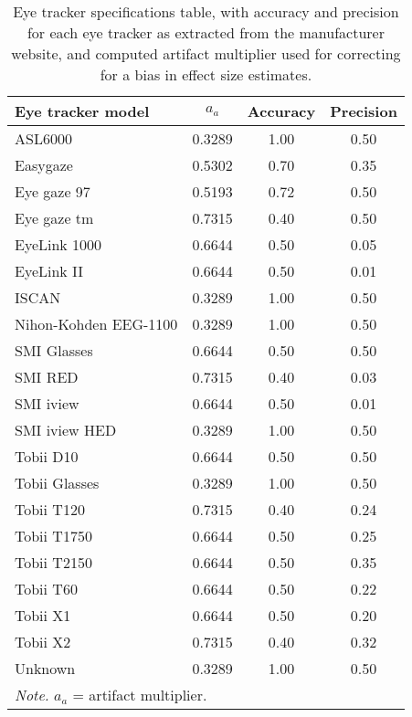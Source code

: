 \begin{table}[ht]
\centering
\caption{Eye tracker specifications table, with accuracy and precision for each eye tracker as extracted from the manufacturer website, and computed artifact multiplier used for correcting for a bias in effect size estimates.} 
\label{tab:eyetracker_specifications}
\begin{tabular}{lccc}
  \hline
Eye tracker model & $a_a$ & Accuracy & Precision \\ 
  \hline
ASL6000 & 0.3289 & 1.00 & 0.50 \\ 
  Easygaze & 0.5302 & 0.70 & 0.35 \\ 
  Eye gaze 97 & 0.5193 & 0.72 & 0.50 \\ 
  Eye gaze tm & 0.7315 & 0.40 & 0.50 \\ 
  EyeLink 1000 & 0.6644 & 0.50 & 0.05 \\ 
  EyeLink II & 0.6644 & 0.50 & 0.01 \\ 
  ISCAN & 0.3289 & 1.00 & 0.50 \\ 
  Nihon-Kohden EEG-1100 & 0.3289 & 1.00 & 0.50 \\ 
  SMI Glasses & 0.6644 & 0.50 & 0.50 \\ 
  SMI RED & 0.7315 & 0.40 & 0.03 \\ 
  SMI iview & 0.6644 & 0.50 & 0.01 \\ 
  SMI iview HED & 0.3289 & 1.00 & 0.50 \\ 
  Tobii D10 & 0.6644 & 0.50 & 0.50 \\ 
  Tobii Glasses & 0.3289 & 1.00 & 0.50 \\ 
  Tobii T120 & 0.7315 & 0.40 & 0.24 \\ 
  Tobii T1750 & 0.6644 & 0.50 & 0.25 \\ 
  Tobii T2150 & 0.6644 & 0.50 & 0.35 \\ 
  Tobii T60 & 0.6644 & 0.50 & 0.22 \\ 
  Tobii X1 & 0.6644 & 0.50 & 0.20 \\ 
  Tobii X2 & 0.7315 & 0.40 & 0.32 \\ 
  Unknown & 0.3289 & 1.00 & 0.50 \\ 
   \hline 
 \multicolumn{4}{l}{\scriptsize{\textit{Note.} $a_a$ = artifact multiplier.}} 
\end{tabular}
\end{table}
